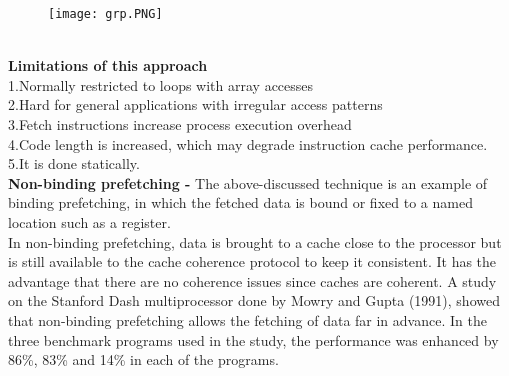 \documentclass{article}
\begin{document}
\begin{enumerate}
\begin{figure}[htp]
    \texttt{[image: grp.PNG]}
    \label{fig:grp}
\end{figure}
\\\textbf{Limitations of this approach}
\\1.Normally restricted to loops with array accesses
\\2.Hard for general applications with irregular access patterns
\\3.Fetch instructions increase process execution overhead
\\4.Code length is increased, which may degrade instruction cache performance.
\\5.It is done statically.
\\\textbf{Non-binding prefetching -} The above-discussed technique is an example of binding prefetching, in which the fetched data is bound or fixed to a named location such as a register. 
\\In non-binding prefetching, data is brought to a cache close to the processor but is still available to the cache coherence protocol to keep it consistent. It has the advantage that there are no coherence issues since caches are coherent. A study on the Stanford Dash multiprocessor done by Mowry and Gupta (1991), showed that non-binding prefetching allows the fetching of data far in advance. In the three benchmark programs used in the study, the performance was enhanced by 86\%, 83\% and 14\% in each of the programs.


\end{enumerate}
\end{document}
